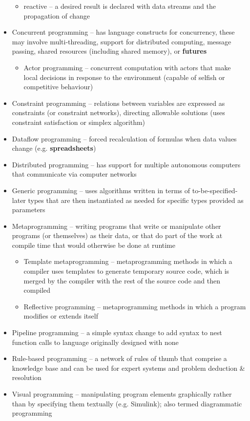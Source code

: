 \documentclass[tikz,border=10pt]{project_plan}
\begin{document}
\begin{itemize}
\begin{itemize}
          \item reactive – a desired result is declared with data streams and the propagation of change
        \end{itemize}
  \item Concurrent programming – has language constructs for concurrency, these may involve multi-threading, support for distributed computing, message passing, shared resources (including shared memory), or \textbf{futures}
        \begin{itemize}
          \item   Actor programming – concurrent computation with actors that make local decisions in response to the environment (capable of selfish or competitive behaviour)
        \end{itemize}
  \item Constraint programming – relations between variables are expressed as constraints (or constraint networks), directing allowable solutions (uses constraint satisfaction or simplex algorithm)
  \item Dataflow programming – forced recalculation of formulas when data values change (e.g. \textbf{spreadsheets})
  \item Distributed programming – has support for multiple autonomous computers that communicate via computer networks
  \item Generic programming – uses algorithms written in terms of to-be-specified-later types that are then instantiated as needed for specific types provided as parameters
  \item Metaprogramming – writing programs that write or manipulate other programs (or themselves) as their data, or that do part of the work at compile time that would otherwise be done at runtime
        \begin{itemize}
          \item Template metaprogramming – metaprogramming methods in which a compiler uses templates to generate temporary source code, which is merged by the compiler with the rest of the source code and then compiled
          \item Reflective programming – metaprogramming methods in which a program modifies or extends itself
        \end{itemize}
  \item Pipeline programming – a simple syntax change to add syntax to nest function calls to language originally designed with none
  \item Rule-based programming – a network of rules of thumb that comprise a knowledge base and can be used for expert systems and problem deduction \& resolution
  \item Visual programming – manipulating program elements graphically rather than by specifying them textually (e.g. Simulink); also termed diagrammatic programming
\end{itemize}
\end{document}
